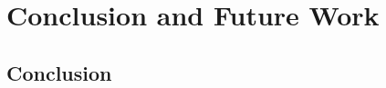 \chapter{Conclusion and Future Work}
\label{ch:conclusion}

\section{Conclusion}
\label{sec:conclusion}
%


